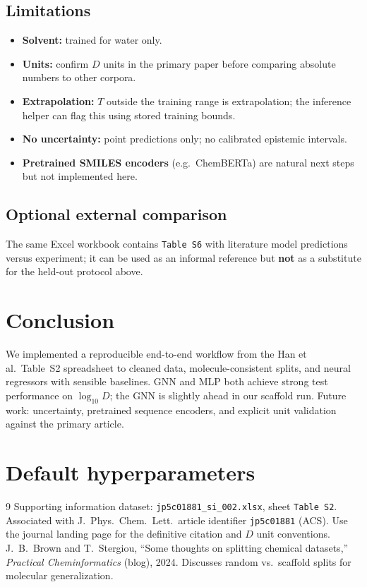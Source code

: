 \documentclass[11pt,a4paper]{article}
\begin{document}
\subsection{Limitations}
\begin{itemize}
  \item \textbf{Solvent:} trained for water only.
  \item \textbf{Units:} confirm $D$ units in the primary paper before comparing absolute numbers to other corpora.
  \item \textbf{Extrapolation:} $T$ outside the training range is extrapolation; the inference helper can flag this using stored training bounds.
  \item \textbf{No uncertainty:} point predictions only; no calibrated epistemic intervals.
  \item \textbf{Pretrained SMILES encoders} (e.g.\ ChemBERTa) are natural next steps but not implemented here.
\end{itemize}

\subsection{Optional external comparison}
The same Excel workbook contains \texttt{Table S6} with literature model predictions versus experiment; it can be used as an informal reference but \textbf{not} as a substitute for the held-out protocol above.

\section{Conclusion}
We implemented a reproducible end-to-end workflow from the Han et al.\ Table~S2 spreadsheet to cleaned data, molecule-consistent splits, and neural regressors with sensible baselines. GNN and MLP both achieve strong test performance on $\log_{10} D$; the GNN is slightly ahead in our scaffold run. Future work: uncertainty, pretrained sequence encoders, and explicit unit validation against the primary article.

\appendix
\section{Default hyperparameters}
\label{app:hp}
\begin{table}[ht]
  \centering
  \caption{Values from \texttt{configs/default.yaml} (unless overridden on the command line).}
  \GeneratedHyperparamTable
\end{table}

\begin{thebibliography}{9}
Supporting information dataset: \texttt{jp5c01881\_si\_002.xlsx}, sheet \texttt{Table S2}. Associated with J.\ Phys.\ Chem.\ Lett.\ article identifier \texttt{jp5c01881} (ACS). Use the journal landing page for the definitive citation and $D$ unit conventions.
J.\ B.\ Brown and T.\ Stergiou, ``Some thoughts on splitting chemical datasets,'' \textit{Practical Cheminformatics} (blog), 2024. Discusses random vs.\ scaffold splits for molecular generalization.
\end{thebibliography}
\end{document}
